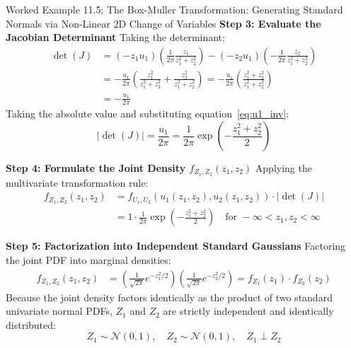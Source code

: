\begin{examplebox}[breakable]{Worked Example 11.5: The Box-Muller Transformation: Generating Standard Normals via Non-Linear 2D Change of Variables}
\textbf{Step 3: Evaluate the Jacobian Determinant}
Taking the determinant:
\begin{align}
\det(J) &= (-z_1 u_1)\left( \frac{1}{2\pi}\frac{z_1}{z_1^2 + z_2^2} \right) - (-z_2 u_1)\left( -\frac{1}{2\pi}\frac{z_2}{z_1^2 + z_2^2} \right) \nonumber \\
&= -\frac{u_1}{2\pi} \left( \frac{z_1^2}{z_1^2 + z_2^2} + \frac{z_2^2}{z_1^2 + z_2^2} \right) = -\frac{u_1}{2\pi} \left( \frac{z_1^2 + z_2^2}{z_1^2 + z_2^2} \right) \nonumber \\
&= -\frac{u_1}{2\pi}
\end{align}
Taking the absolute value and substituting equation~\eqref{eq:u1_inv}:
\begin{equation}
|\det(J)| = \frac{u_1}{2\pi} = \frac{1}{2\pi}\exp\left( -\frac{z_1^2 + z_2^2}{2} \right)
\end{equation}

\textbf{Step 4: Formulate the Joint Density $f_{Z_1, Z_2}(z_1, z_2)$}
Applying the multivariate transformation rule:
\begin{align}
f_{Z_1, Z_2}(z_1, z_2) &= f_{U_1, U_2}(u_1(z_1, z_2), u_2(z_1, z_2)) \cdot |\det(J)| \nonumber \\
&= 1 \cdot \frac{1}{2\pi}\exp\left( -\frac{z_1^2 + z_2^2}{2} \right) \quad \text{for } -\infty < z_1, z_2 < \infty
\end{align}

\textbf{Step 5: Factorization into Independent Standard Gaussians}
Factoring the joint PDF into marginal densities:
\begin{align}
f_{Z_1, Z_2}(z_1, z_2) &= \left( \frac{1}{\sqrt{2\pi}} e^{-z_1^2/2} \right) \left( \frac{1}{\sqrt{2\pi}} e^{-z_2^2/2} \right) = f_{Z_1}(z_1) \cdot f_{Z_2}(z_2)
\end{align}
Because the joint density factors identically as the product of two standard univariate normal PDFs, $Z_1$ and $Z_2$ are strictly independent and identically distributed:
\begin{equation}
Z_1 \sim \mathcal{N}(0, 1), \quad Z_2 \sim \mathcal{N}(0, 1), \quad Z_1 \perp Z_2
\end{equation}


\end{examplebox}
